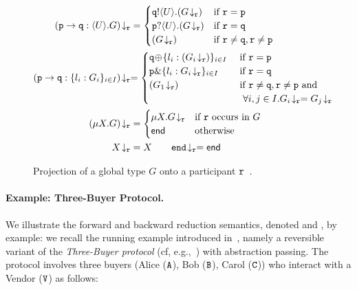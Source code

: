 \documentclass[runningheads,plain]{llncs}
\begin{document}
\begin{figure}[!t]
{
\begin{align*}
\tproj{(\gtcom{p}{q}{U}{G})}{\gpart{r}} & = 
\begin{cases}
\ltout{q}{U}{(\tproj{G}{\gpart{r}})} & \text{if $\gpart{r} = \gpart{p}$} \\
\ltinp{p}{U}{(\tproj{G}{\gpart{r}})} & \text{if $\gpart{r} = \gpart{q}$} \\
(\tproj{G}{\gpart{r}}) &  \text{if $\gpart{r} \neq \gpart{q}, \gpart{r} \neq \gpart{p}$}
\end{cases}
\\
\tproj{(\gtcho{p}{q}{l_i}{G_i})}{\gpart{r}}  
& 
{= 
\begin{cases}
\ltsel{q}{\lbl_i}{(\tproj{G_i}{\gpart{r}})}{i}{I}  & \text{ if $\gpart{r} = \gpart{p}$} \\
\ltbra{p}{\lbl_i}{\tproj{G_i}{\gpart{r}}}{i}{I}  & \text{ if $\gpart{r} = \gpart{q}$} \\
(\tproj{{G_1}}{\gpart{r}}) &  \text{ if $\gpart{r} \neq \gpart{q}, \gpart{r} \neq \gpart{p}$ and} \\ 
& \text{~~$\forall i, j \in I. \tproj{{G_i}}{\gpart{r}} = \tproj{{G_j}}{\gpart{r}}$}
\end{cases}
}
\\
\tproj{(\mu X. G)}{\gpart{r}} &= 
\begin{cases}
\mu X. \tproj{G}{\gpart{r}} & \text{if $\gpart{r}$ occurs in $G$}
\\
\lend & \text{otherwise}
\end{cases}
\\
\tproj{X}{\gpart{r}} & = X
\qquad
\tproj{\gend}{\gpart{r}} = \lend
\end{align*}
}
\vspace{-4mm}
\caption{Projection of a global type $G$ onto a participant $\mathtt{r}$~\cite{DBLP:conf/ppdp/MezzinaP17}.\label{f:proj}}
\end{figure}

\paragraph{Example: Three-Buyer Protocol.}
We illustrate the 
forward and backward reduction semantics, denoted \fw and \bk, by example: we recall the running example introduced in~\cite{DBLP:conf/ppdp/MezzinaP17}, namely
  a reversible variant of the \emph{Three-Buyer protocol}  (cf, e.g.,~\cite{CDYP2015})
with abstraction passing. 
The protocol 
involves three buyers (Alice ($\mathtt{A}$), Bob ($\mathtt{B}$), Carol ($\mathtt{C}$)) who interact with a Vendor ($\mathtt{V}$) as follows:
\end{document}
